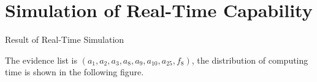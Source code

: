 
\section{Simulation of Real-Time Capability}



\begin{frame}{Result of Real-Time Simulation}
  \begin{overlayarea}{\textwidth}{7cm}
  The evidence list is $(a_1, a_2, a_3, a_8, a_9, a_{10}, a_{25}, f_8)$, the distribution of computing time is shown in the following figure.

  \begin{center}
    
  \end{center}    
  \end{overlayarea}
\end{frame}


